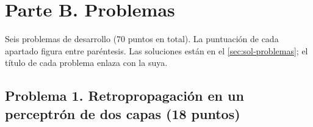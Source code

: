 \chapter*{Parte B. Problemas}
\label{cap:parteB}

Seis problemas de desarrollo (70 puntos en total). La puntuación de cada apartado figura entre paréntesis. Las soluciones están en el \cref{sec:sol-problemas}; el título de cada problema enlaza con la suya.

\section*{Problema 1. Retropropagación en un perceptrón de dos capas (18 puntos)}

